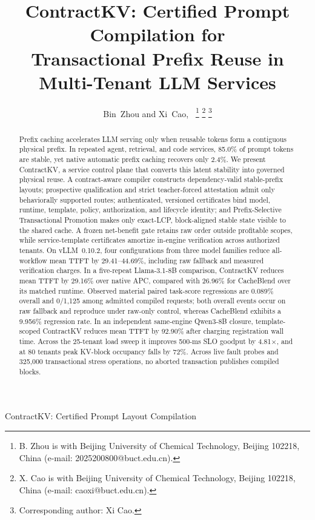 \documentclass[journal]{IEEEtran}
\begin{document}
\title{ContractKV: Certified Prompt Compilation for\\Transactional Prefix Reuse in Multi-Tenant LLM Services}

\author{Bin~Zhou and Xi~Cao,~
\thanks{B. Zhou is with Beijing University of Chemical Technology, Beijing 102218, China (e-mail: 2025200800@buct.edu.cn).}
\thanks{X. Cao is with Beijing University of Chemical Technology, Beijing 102218, China (e-mail: caoxi@buct.edu.cn).}
\thanks{Corresponding author: Xi Cao.}
}

%
{ContractKV: Certified Prompt Layout Compilation}

\maketitle

\begin{abstract}
Prefix caching accelerates LLM serving only when reusable tokens form a contiguous physical prefix. In repeated agent, retrieval, and code services, 85.0\% of prompt tokens are stable, yet native automatic prefix caching recovers only 2.4\%. We present ContractKV, a service control plane that converts this latent stability into governed physical reuse. A contract-aware compiler constructs dependency-valid stable-prefix layouts; prospective qualification and strict teacher-forced attestation admit only behaviorally supported routes; authenticated, versioned certificates bind model, runtime, template, policy, authorization, and lifecycle identity; and Prefix-Selective Transactional Promotion makes only exact-LCP, block-aligned stable state visible to the shared cache. A frozen net-benefit gate retains raw order outside profitable scopes, while service-template certificates amortize in-engine verification across authorized tenants. On vLLM~0.10.2, four configurations from three model families reduce all-workflow mean TTFT by 29.41--44.69\%, including raw fallback and measured verification charges. In a five-repeat Llama-3.1-8B comparison, ContractKV reduces mean TTFT by 29.16\% over native APC, compared with 26.96\% for CacheBlend over its matched runtime. Observed material paired task-score regressions are 0.089\% overall and 0/1{,}125 among admitted compiled requests; both overall events occur on raw fallback and reproduce under raw-only control, whereas CacheBlend exhibits a 9.956\% regression rate. In an independent same-engine Qwen3-8B closure, template-scoped ContractKV reduces mean TTFT by 92.90\% after charging registration wall time. Across the 25-tenant load sweep it improves 500-ms SLO goodput by 4.81$\times$, and at 80 tenants peak KV-block occupancy falls by 72\%. Across live fault probes and 325{,}000 transactional stress operations, no aborted transaction publishes compiled blocks.
\end{abstract}
\end{document}
